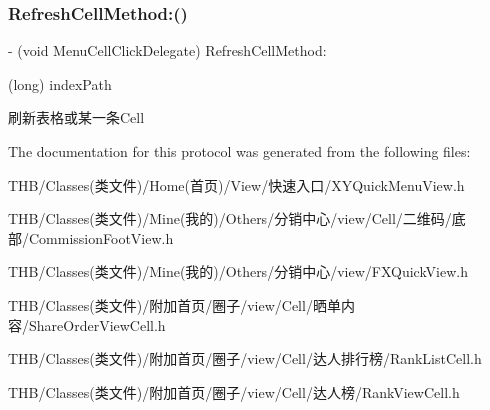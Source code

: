\subsubsection{\texorpdfstring{Refresh\+Cell\+Method\+:()}{RefreshCellMethod:()}}
{\footnotesize\ttfamily -\/ (void Menu\+Cell\+Click\+Delegate) Refresh\+Cell\+Method\+: \begin{DoxyParamCaption}\item[{(long)}]{index\+Path }\end{DoxyParamCaption}\hspace{0.3cm}{\ttfamily [optional]}}

刷新表格或某一条\+Cell 

The documentation for this protocol was generated from the following files\+:\begin{DoxyCompactItemize}
\item 
T\+H\+B/\+Classes(类文件)/\+Home(首页)/\+View/快速入口/X\+Y\+Quick\+Menu\+View.\+h\item 
T\+H\+B/\+Classes(类文件)/\+Mine(我的)/\+Others/分销中心/view/\+Cell/二维码/底部/Commission\+Foot\+View.\+h\item 
T\+H\+B/\+Classes(类文件)/\+Mine(我的)/\+Others/分销中心/view/F\+X\+Quick\+View.\+h\item 
T\+H\+B/\+Classes(类文件)/附加首页/圈子/view/\+Cell/晒单内容/Share\+Order\+View\+Cell.\+h\item 
T\+H\+B/\+Classes(类文件)/附加首页/圈子/view/\+Cell/达人排行榜/Rank\+List\+Cell.\+h\item 
T\+H\+B/\+Classes(类文件)/附加首页/圈子/view/\+Cell/达人榜/Rank\+View\+Cell.\+h\end{DoxyCompactItemize}
